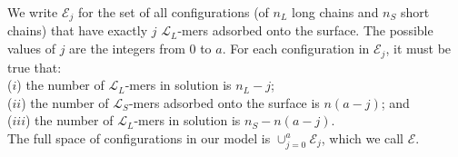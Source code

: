 \documentclass[journal=mamobx,manuscript=article]{achemso}
\newcommand{\leng}{\mathcal{L}}
\begin{document}





We write $\mathcal{E}_j$ for the set of all configurations (of $n_L$ long chains and $n_S$ short chains) that have exactly $j$ 
$\leng_L$-mers adsorbed onto the surface.  
The possible values of $j$ are the integers from 0 to $a$.
For each configuration in $\mathcal{E}_j$, it must be true that:
\\
 ($i$) the number of $\leng_L$-mers in solution is $n_L-j$;
 \\
 ($ii$) the number of $\leng_S$-mers adsorbed onto the surface is $n(a-j)$; and 
 \\
 ($iii$) the number of $\leng_L$-mers in solution is $n_S-n(a-j)$.
\\
The full space of configurations in our model is $\cup_{j=0}^a {\mathcal{E}_j}$, 
which we call $\mathcal{E}$.
\end{document}
